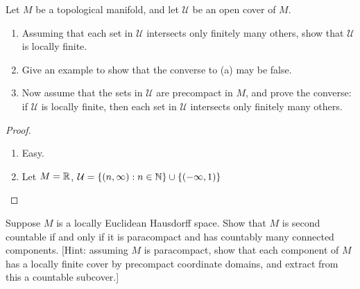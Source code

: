 \begin{problem}
  Let $M$ be a topological manifold, and let $\mathcal{U}$ be an open cover of $M$.
  \begin{enumerate}
    \item  Assuming that each set in $\mathcal{U}$ intersects only finitely many others, show
    that $\mathcal{U}$ is locally finite.

    \item Give an example to show that the converse to (a) may be false.
    
    \item Now assume that the sets in $\mathcal{U}$ are precompact in $M$, and prove the converse: if $\mathcal{U}$ is locally finite, then each set in $\mathcal{U}$ intersects only finitely many others.
  \end{enumerate}

  \begin{proof}
    \begin{enumerate}
      \item Easy.
      \item Let $M=\mathbb{R}$, $\mathcal{U} = \{(n, \infty):n \in \mathbb{N}\} \cup \{(-\infty, 1)\}$
    \end{enumerate}
  \end{proof}
\end{problem}

\begin{problem}
  Suppose $M$ is a locally Euclidean Hausdorff space. Show that $M$ is second
  countable if and only if it is paracompact and has countably many connected
  components. [Hint: assuming $M$ is paracompact, show that each component
  of $M$ has a locally finite cover by precompact coordinate domains, and extract
  from this a countable subcover.]
\end{problem}


